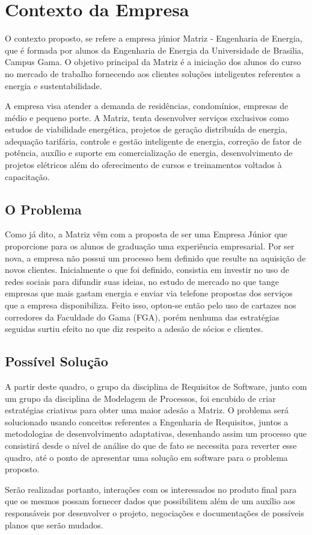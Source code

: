 \chapter[Contexto da Empresa]{Contexto da Empresa}
O contexto proposto, se refere a empresa júnior Matriz - Engenharia de Energia, que é 
formada por alunos da Engenharia de Energia da Universidade de Brasilia, Campus Gama. 
O objetivo principal da Matriz é a iniciação dos alunos do curso no mercado de trabalho 
fornecendo aos clientes soluções inteligentes referentes a energia e sustentabilidade.

A empresa visa atender a demanda de residências, condomínios, empresas de médio 
e pequeno porte. A Matriz, tenta desenvolver serviços exclusivos como estudos de
viabilidade energética, projetos de geração distribuída de energia, adequação tarifária, 
controle e gestão inteligente de energia, correção de fator de potência, auxílio e suporte
em comercialização de energia, desenvolvimento de projetos elétricos além do oferecimento 
de cursos e treinamentos voltados à capacitação.

\section{O Problema}
Como já dito, a Matriz vêm com a proposta de ser uma Empresa Júnior que proporcione para 
os alunos de graduação uma experiência empresarial. Por ser nova, a empresa não possui 
um processo bem definido que resulte na aquisição de novos clientes. Inicialmente o que 
foi definido, consistia em investir no uso de redes sociais para difundir suas ideias, 
no estudo de mercado no que tange empresas que mais gastam energia e enviar via telefone
propostas dos serviços que a empresa disponibiliza. Feito isso, optou-se então pelo uso de
cartazes nos corredores da Faculdade do Gama (FGA), porém nenhuma das estratégias seguidas
surtiu efeito no que diz respeito a adesão de sócios e clientes.

\section{Possível Solução}
A partir deste quadro, o grupo da disciplina de Requisitos de Software, junto com um 
grupo da disciplina de Modelagem de Processos, foi encubido de criar estratégias 
criativas para obter uma maior adesão a Matriz. O problema será solucionado 
usando conceitos referentes a Engenharia de Requisitos, juntos a metodologias de 
desenvolvimento adaptativas, desenhando assim um processo que consistirá desde o nível 
de análise do que de fato se necessita para reverter esse quadro, até o ponto de 
apresentar uma solução em software para o problema proposto.

Serão realizadas portanto, interações com os interessados no produto final para que 
os mesmos possam fornecer dados que possibilitem além de um auxílio aos responsáveis 
por desenvolver o projeto, negociações e documentações de possíveis planos que serão
mudados.

